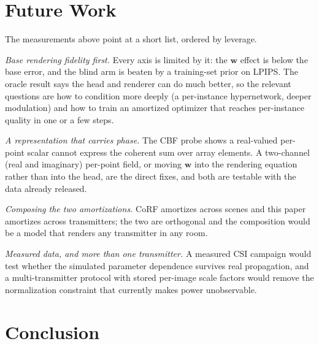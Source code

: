 \documentclass[conference]{IEEEtran}
\begin{document}
\section{Future Work}
\label{sec:future}

The measurements above point at a short list, ordered by leverage.

\emph{Base rendering fidelity first.} Every axis is limited by it: the
$\mathbf{w}$ effect is below the base error, and the blind arm is beaten by a
training-set prior on LPIPS. The oracle result says the head and renderer can do
much better, so the relevant questions are how to condition more deeply (a
per-instance hypernetwork, deeper modulation) and how to train an amortized
optimizer that reaches per-instance quality in one or a few steps.

\emph{A representation that carries phase.} The CBF probe shows a real-valued
per-point scalar cannot express the coherent sum over array elements. A
two-channel (real and imaginary) per-point field, or moving $\mathbf{w}$ into
the rendering equation rather than into the head, are the direct fixes, and both
are testable with the data already released.

\emph{Composing the two amortizations.} CoRF \cite{corf} amortizes across
scenes and this paper amortizes across transmitters; the two are orthogonal and
the composition would be a model that renders any transmitter in any room.

\emph{Measured data, and more than one transmitter.} A measured CSI campaign
would test whether the simulated parameter dependence survives real propagation,
and a multi-transmitter protocol with stored per-image scale factors would
remove the normalization constraint that currently makes power unobservable.

\section{Conclusion}
\end{document}
